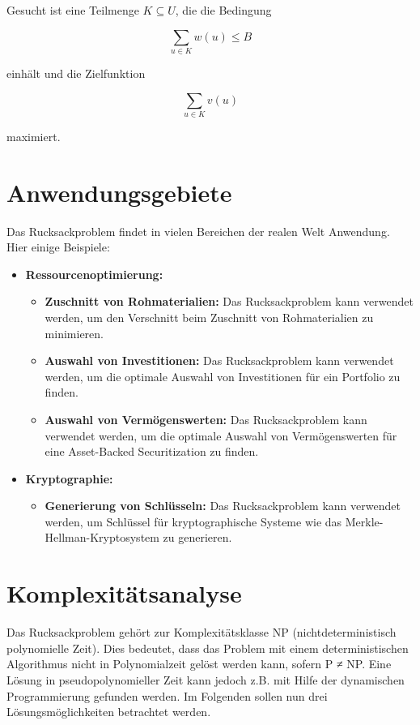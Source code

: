 \documentclass[12pt]{report}
\begin{document}
Gesucht ist eine Teilmenge $K \subseteq U$, die die Bedingung

$$\sum_{u \in K} w(u) \leq B$$

einhält und die Zielfunktion

$$\sum_{u \in K} v(u)$$

maximiert. \cite{kellerer2004knapsack}



\section{Anwendungsgebiete}
Das Rucksackproblem findet in vielen Bereichen der realen Welt Anwendung. Hier einige Beispiele:

\begin{itemize}
	\item \textbf{Ressourcenoptimierung:}
	\begin{itemize}
		\item \textbf{Zuschnitt von Rohmaterialien:} Das Rucksackproblem kann verwendet werden, um den Verschnitt beim Zuschnitt von Rohmaterialien zu minimieren.\cite{kellerer2004knapsack} 
		\item \textbf{Auswahl von Investitionen:} Das Rucksackproblem kann verwendet werden, um die optimale Auswahl von Investitionen für ein Portfolio zu finden.\cite{kellerer2004knapsack}
		\item \textbf{Auswahl von Vermögenswerten:} Das Rucksackproblem kann verwendet werden, um die optimale Auswahl von Vermögenswerten für eine Asset-Backed Securitization zu finden.\cite{kellerer2004knapsack}
	\end{itemize}
	\item \textbf{Kryptographie:}
	\begin{itemize}
		\item \textbf{Generierung von Schlüsseln:} Das Rucksackproblem kann verwendet werden, um Schlüssel für kryptographische Systeme wie das Merkle-Hellman-Kryptosystem zu generieren.\cite{kellerer2004knapsack}
	\end{itemize}
\end{itemize}

\section{Komplexitätsanalyse}
Das Rucksackproblem gehört zur Komplexitätsklasse NP (nichtdeterministisch polynomielle Zeit). Dies bedeutet, dass das Problem mit einem deterministischen Algorithmus nicht in Polynomialzeit gelöst werden kann, sofern P ≠ NP. Eine Lösung in pseudopolynomieller Zeit kann jedoch z.B. mit Hilfe der dynamischen Programmierung gefunden werden. \cite{assi8672677}
Im Folgenden sollen nun drei Lösungsmöglichkeiten betrachtet werden.
\end{document}
